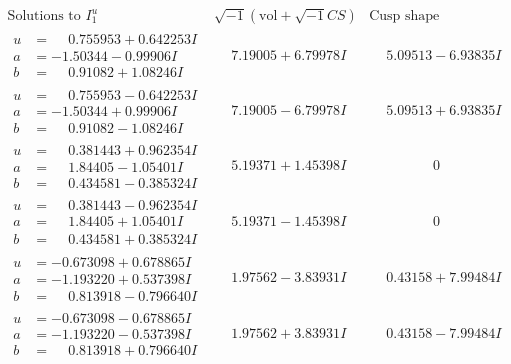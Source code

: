 \documentclass[1p]{elsarticle_modified}
\theoremstyle{definition}
\newcommand{\I}{\sqrt{-1}}
\begin{document}
$$\begin{array}{c|c|c}  
\text{Solutions to }I^u_{1}& \I (\text{vol} + \sqrt{-1}CS) & \text{Cusp shape}\\
 \hline 
\begin{aligned}
u &= \phantom{-}0.755953 + 0.642253 I \\
a &= -1.50344 - 0.99906 I \\
b &= \phantom{-}0.91082 + 1.08246 I\end{aligned}
 & \phantom{-}7.19005 + 6.79978 I & \phantom{-}5.09513 - 6.93835 I \\ \hline\begin{aligned}
u &= \phantom{-}0.755953 - 0.642253 I \\
a &= -1.50344 + 0.99906 I \\
b &= \phantom{-}0.91082 - 1.08246 I\end{aligned}
 & \phantom{-}7.19005 - 6.79978 I & \phantom{-}5.09513 + 6.93835 I \\ \hline\begin{aligned}
u &= \phantom{-}0.381443 + 0.962354 I \\
a &= \phantom{-}1.84405 - 1.05401 I \\
b &= \phantom{-}0.434581 - 0.385324 I\end{aligned}
 & \phantom{-}5.19371 + 1.45398 I & \phantom{-0.000000 } 0 \\ \hline\begin{aligned}
u &= \phantom{-}0.381443 - 0.962354 I \\
a &= \phantom{-}1.84405 + 1.05401 I \\
b &= \phantom{-}0.434581 + 0.385324 I\end{aligned}
 & \phantom{-}5.19371 - 1.45398 I & \phantom{-0.000000 } 0 \\ \hline\begin{aligned}
u &= -0.673098 + 0.678865 I \\
a &= -1.193220 + 0.537398 I \\
b &= \phantom{-}0.813918 - 0.796640 I\end{aligned}
 & \phantom{-}1.97562 - 3.83931 I & \phantom{-}0.43158 + 7.99484 I \\ \hline\begin{aligned}
u &= -0.673098 - 0.678865 I \\
a &= -1.193220 - 0.537398 I \\
b &= \phantom{-}0.813918 + 0.796640 I\end{aligned}
 & \phantom{-}1.97562 + 3.83931 I & \phantom{-}0.43158 - 7.99484 I \\ \hline\begin{aligned}

\end{aligned}
\end{array}$$
\end{document}
